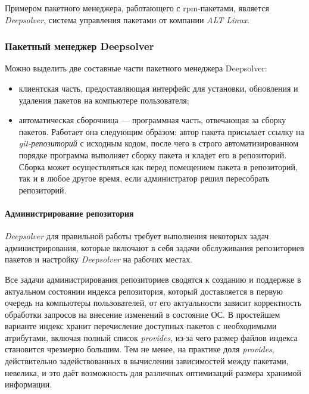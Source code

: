 Примером пакетного менеджера, работающего с rpm-пакетами, является \textit{Deepsolver}, система
управления пакетами от компании \textit{ALT Linux}.\\

\subsubsection{Пакетный менеджер Deepsolver}
Можно выделить две составные части пакетного менеджера Deepsolver:
\begin{itemize}
\item{клиентская часть, предоставляющая интерфейс для установки, обновления
 и удаления пакетов на компьютере пользователя;}
\item{автоматическая сборочница \cite{girar} --- программная часть, отвечающая за сборку пакетов.
Работает она следующим образом: автор пакета присылает ссылку на \textit{git-репозиторий} \cite{git}с исходным кодом, %
после чего в строго автоматизированном порядке программа выполняет сборку пакета и кладет
его в репозиторий. Сборка может осуществляться как перед помещением пакета в репозиторий,
так и в любое другое время, если администратор решил пересобрать репозиторий.}
\end{itemize}

\paragraph{Администрирование репозитория\\} 
\textit{Deepsolver} для правильной работы требует выполнения некоторых задач 
администрирования, которые включают в себя задачи обслуживания репозиториев
пакетов и настройку \textit{Deepsolver} на рабочих местах.

Все задачи администрирования репозиториев сводятся к созданию и поддержке в
актуальном состоянии индекса репозитория, который доставляется в первую очередь на компьютеры
пользователей, от его актуальности зависит корректность обработки запросов 
на внесение изменений в состояние ОС. В простейшем варианте индекс
хранит перечисление доступных пакетов с необходимыми атрибутами, включая
полный список \textit{provides}, из-за чего размер файлов индекса становится
чрезмерно большим. Тем не менее, на практике доля \textit{provides}, действительно
задействованных в вычислении зависимостей между пакетами, невелика,
и это даёт возможность для различных оптимизаций размера хранимой информации.

